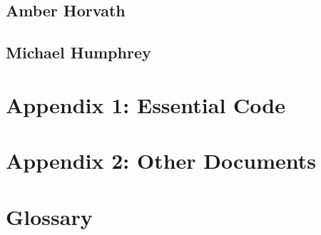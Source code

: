 \documentclass[letterpaper,10pt]{article}
\begin{document}
\subsection{Amber Horvath}

\subsection{Michael Humphrey}


\section{Appendix 1: Essential Code}


\section{Appendix 2: Other Documents}


\section{Glossary}
\glsaddall
\printglossaries
\end{document}
